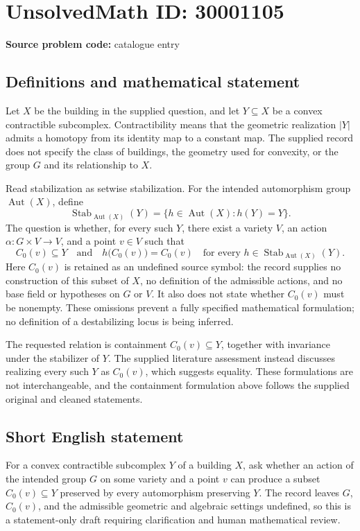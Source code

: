 \documentclass[11pt]{article}
\begin{document}
\section*{UnsolvedMath ID: 30001105}
\textbf{Source problem code:} catalogue entry
\subsection{Definitions and mathematical statement}
Let \(X\) be the building in the supplied question, and let \(Y\subseteq X\) be a convex contractible subcomplex. Contractibility means that the geometric realization \(|Y|\) admits a homotopy from its identity map to a constant map. The supplied record does not specify the class of buildings, the geometry used for convexity, or the group \(G\) and its relationship to \(X\).

Read stabilization as setwise stabilization. For the intended automorphism group \(\operatorname{Aut}(X)\), define
\[
\operatorname{Stab}_{\operatorname{Aut}(X)}(Y)
=\{h\in\operatorname{Aut}(X):h(Y)=Y\}.
\]
The question is whether, for every such \(Y\), there exist a variety \(V\), an action \(\alpha:G\times V\to V\), and a point \(v\in V\) such that
\[
C_0(v)\subseteq Y
\quad\text{and}\quad
h\bigl(C_0(v)\bigr)=C_0(v)
\quad\text{for every }h\in\operatorname{Stab}_{\operatorname{Aut}(X)}(Y).
\]
Here \(C_0(v)\) is retained as an undefined source symbol: the record supplies no construction of this subset of \(X\), no definition of the admissible actions, and no base field or hypotheses on \(G\) or \(V\). It also does not state whether \(C_0(v)\) must be nonempty. These omissions prevent a fully specified mathematical formulation; no definition of a destabilizing locus is being inferred.

The requested relation is containment \(C_0(v)\subseteq Y\), together with invariance under the stabilizer of \(Y\). The supplied literature assessment instead discusses realizing every such \(Y\) as \(C_0(v)\), which suggests equality. These formulations are not interchangeable, and the containment formulation above follows the supplied original and cleaned statements.
\subsection{Short English statement}
For a convex contractible subcomplex \(Y\) of a building \(X\), ask whether an action of the intended group \(G\) on some variety and a point \(v\) can produce a subset \(C_0(v)\subseteq Y\) preserved by every automorphism preserving \(Y\). The record leaves \(G\), \(C_0(v)\), and the admissible geometric and algebraic settings undefined, so this is a statement-only draft requiring clarification and human mathematical review.
\end{document}

